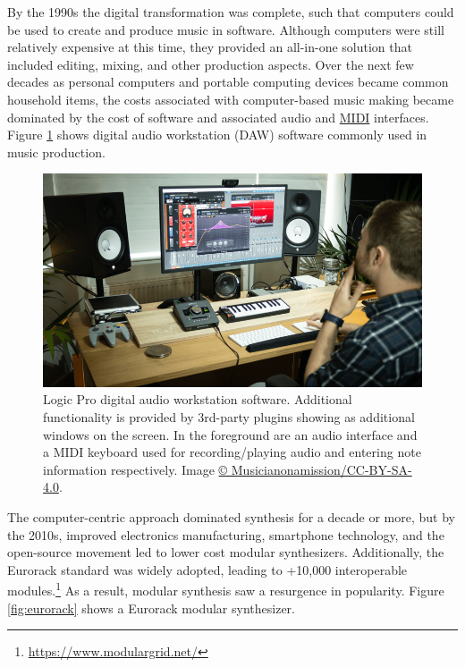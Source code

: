 \documentclass[
]{book}
\begin{document}
By the 1990s the digital transformation was complete, such that computers could be used to create and produce music in software.
Although computers were still relatively expensive at this time, they provided an all-in-one solution that included editing, mixing, and other production aspects.
Over the next few decades as personal computers and portable computing devices became common household items, the costs associated with computer-based music making became dominated by the cost of software and associated audio and \href{https://en.wikipedia.org/wiki/MIDI}{MIDI} interfaces.
Figure \ref{fig:logic} shows digital audio workstation (DAW) software commonly used in music production.



\begin{figure}
\includegraphics[width=1\linewidth]{images/800px-Logic_PRO_X_Tutorial} \caption{Logic Pro digital audio workstation software. Additional functionality is provided by 3rd-party plugins showing as additional windows on the screen. In the foreground are an audio interface and a MIDI keyboard used for recording/playing audio and entering note information respectively. Image \href{https://commons.wikimedia.org/wiki/File:Logic_PRO_X_Tutorial.png}{© Musicianonamission/CC-BY-SA-4.0}.}\label{fig:logic}
\end{figure}

The computer-centric approach dominated synthesis for a decade or more, but by the 2010s, improved electronics manufacturing, smartphone technology, and the open-source movement led to lower cost modular synthesizers.
Additionally, the Eurorack standard \citep{DoepferMusikelektronik2022, DoepferMusikelektronik2022a} was widely adopted, leading to +10,000 interoperable modules.\footnote{\url{https://www.modulargrid.net/}}
As a result, modular synthesis saw a resurgence in popularity.
Figure \ref{fig:eurorack} shows a Eurorack modular synthesizer.
\end{document}
